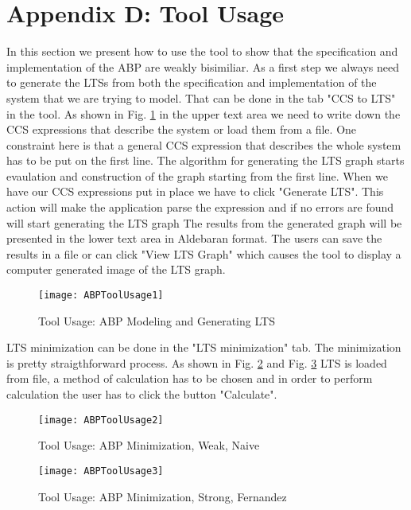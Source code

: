 \section*{Appendix D: Tool Usage}

In this section we present how to use the tool to show that the specification and 
implementation of the ABP are weakly bisimiliar. As a first step we always need to
generate the LTSs from both the specification and implementation of the system that
we are trying to model. That can be done in the tab "CCS to LTS" in the tool. As shown
in Fig. \ref{fig:abptoolusage1} in the upper text area we need to write down the CCS 
expressions that describe the system or load them from a file. One constraint here
is that a general CCS expression that describes the whole system has to be put on
the first line. The algorithm for generating the LTS graph starts evaulation and 
construction of the graph starting from the first line. When we have our CCS expressions
put in place we have to click "Generate LTS". This action will make the application
parse the expression and if no errors are found will start generating the LTS graph
The results from the generated graph will be presented in the lower text area in 
Aldebaran format. The users can save the results in a file or can click "View LTS Graph" 
which causes the tool to display a computer generated image of the LTS graph.

\begin{figure}
\centering
\texttt{[image: ABPToolUsage1]}
\caption{Tool Usage: ABP Modeling and Generating LTS}
\label{fig:abptoolusage1}
\end{figure}

LTS minimization can be done in the "LTS minimization" tab. The minimization is pretty 
straigthforward process. As shown in Fig. \ref{fig:abptoolusage2} and Fig. \ref{fig:abptoolusage3}
LTS is loaded from file, a method of calculation has to be chosen and in order to perform
calculation the user has to click the button "Calculate".

\begin{figure}
\centering
\texttt{[image: ABPToolUsage2]}
\caption{Tool Usage: ABP Minimization, Weak, Naive}
\label{fig:abptoolusage2}
\end{figure}

\begin{figure}
\centering
\texttt{[image: ABPToolUsage3]}
\caption{Tool Usage: ABP Minimization, Strong, Fernandez}
\label{fig:abptoolusage3}
\end{figure}


